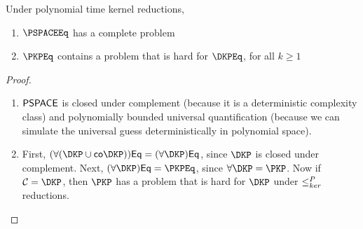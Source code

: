 \begin{corollary}\label{cor:hardproblems}
  Under polynomial time kernel reductions,
  \begin{enumerate}
  \item $\PSPACEEq$ has a complete problem
  \item $\PKPEq$ contains a problem that is hard for $\DKPEq$, for all $k \geq 1$
  \end{enumerate}
\end{corollary}
\begin{proof}\mbox{}
  \begin{enumerate}
  \item ${\mathsf{PSPACE}}$ is closed under complement (because it is a deterministic complexity class) and polynomially bounded universal quantification (because we can simulate the universal guess deterministically in polynomial space).
  \item
    First, $(\forall(\DKP \cup \mathsf{co}\DKP))\mathsf{Eq} = (\forall \DKP)\mathsf{Eq}$, since $\DKP$ is closed under complement.  %
    Next, $(\forall \DKP)\mathsf{Eq} = \PKPEq$, since $\forall \DKP = \PKP$.  %
    Now if $\mathcal{C} = \DKP$, then $\PKP$ has a problem that is hard for $\DKP$ under $\leq^{P}_{ker}$ reductions.
    \qedhere
  \end{enumerate}
\end{proof}

